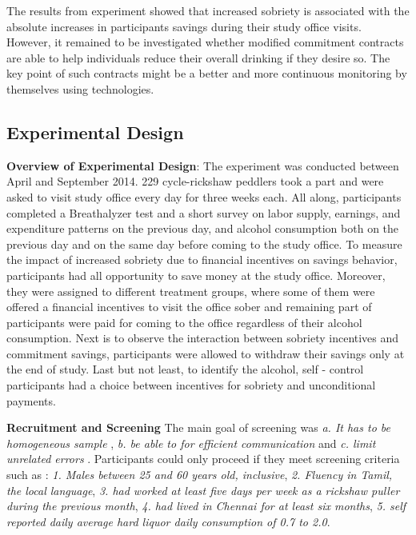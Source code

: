\documentclass[a4paper,12pt]{article}
\begin{document}
The results from experiment showed that increased sobriety is associated with the absolute increases in participants savings during their study office visits. However, it remained to be investigated whether modified commitment contracts are able to help individuals reduce their overall drinking if they desire so. The key point of such contracts might be a better and more continuous monitoring by themselves using technologies.  



\subsection{Experimental Design}

\textbf{Overview of Experimental Design}:
The experiment was conducted between April and September 2014. 229 cycle-rickshaw peddlers took a part and were asked to visit study office every day for three weeks each. All along, participants completed a Breathalyzer test and a short survey on labor supply, earnings, and expenditure patterns on the previous day, and alcohol consumption both on the previous day and on the same day before coming to the study office. To measure the impact of increased sobriety due to financial incentives on savings behavior, participants had all opportunity to save money at the study office. Moreover, they were assigned to different treatment groups, where some of them were offered a financial incentives to visit the office sober and remaining part of participants were paid for coming to the office regardless of their alcohol consumption. Next is to observe the interaction between sobriety incentives and commitment savings, participants were allowed to withdraw their savings only at the end of study. Last but not least, to identify the alcohol, self - control participants had a choice between incentives for sobriety and unconditional payments.  

\textbf{Recruitment and Screening}
The main goal of screening was \textit{a. It has to be homogeneous sample }, \textit{b. be able to for efficient communication} and \textit{c. limit unrelated errors }. Participants could only proceed if they meet screening criteria such as : \textit{1. Males between 25 and 60 years old, inclusive}, \textit{2. Fluency in Tamil, the local language}, \textit{3. had worked at least five days per week as a rickshaw puller during the previous month}, \textit{4. had lived in Chennai for at least six months}, \textit{5. self reported daily average hard liquor daily consumption of 0.7 to 2.0}. 
\end{document}
